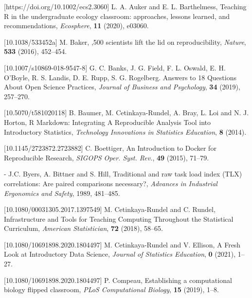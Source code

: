 \documentclass{aims}
\theoremstyle{definition}
\begin{document}
\begin{thebibliography}{99}
%
 [https://doi.org/10.1002/ecs2.3060]
     \newblock  L. A. Auker and E. L. Barthelmess,
     \newblock Teaching R in the undergraduate ecology classroom: approaches, lessons learned, and recommendations,
     \newblock \emph{Ecosphere}, \textbf{11} (2020), e03060.

 [10.1038/533452a]
     \newblock  M. Baker,
     ,500 scientists lift the lid on reproducibility,
     \newblock \emph{Nature}, \textbf{533} (2016), 452--454.

 [10.1007/s10869-018-9547-8]
     \newblock  G. C. Banks, J. G. Field, F. L. Oswald, E. H. O'Boyle, R. S. Landis, D. E. Rupp, S. G. Rogelberg.
     \newblock Answers to 18 Questions About Open Science Practices,
     \newblock \emph{Journal of Business and Psychology}, \textbf{34} (2019), 257--270.

 [10.5070/t581020118]
     \newblock B. Baumer, M. Cetinkaya-Rundel, A. Bray, L. Loi and N. J. Horton,
     \newblock R Markdown: Integrating A Reproducible Analysis Tool into Introductory Statistics,
     \newblock \emph{Technology Innovations in Statistics Education}, \textbf{8} (2014).

 [10.1145/2723872.2723882]
     \newblock  C. Boettiger,
     \newblock An Introduction to Docker for Reproducible Research,
     \newblock \emph{SIGOPS Oper. Syst. Rev.}, \textbf{49} (2015), 71--79.

 -
     \newblock  J.C. Byers, A. Bittner and S. Hill,
     \newblock Traditional and raw task load index (TLX) correlations: Are paired comparisons necessary?,
     \newblock \emph{Advances in Industrial Ergonomics and Safety}, 1989, 481--485.

 [10.1080/00031305.2017.1397549]
     \newblock  M. Cetinkaya-Rundel and C. Rundel,
     \newblock Infrastructure and Tools for Teaching Computing Throughout the Statistical Curriculum,
     \newblock \emph{American Statistician}, \textbf{72} (2018), 58--65.

 [10.1080/10691898.2020.1804497]
     \newblock  M. Cetinkaya-Rundel and V. Ellison,
     \newblock A Fresh Look at Introductory Data Science,
     \newblock \emph{Journal of Statistics Education}, \textbf{0} (2021), 1--27.

 [10.1080/10691898.2020.1804497]
     \newblock P. Compeau,
     \newblock Establishing a computational biology flipped classroom,
     \newblock \emph{PLoS Computational Biology}, \textbf{15} (2019), 1--8.


\end{thebibliography}
\end{document}
